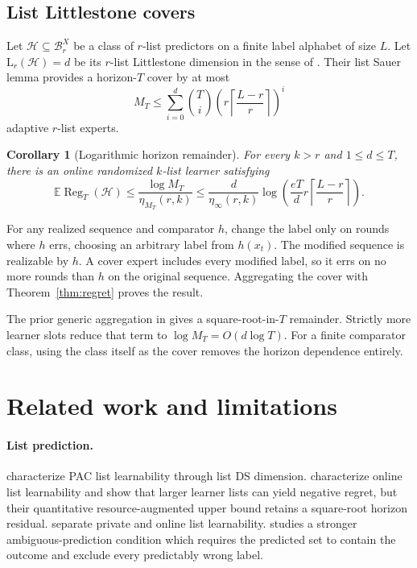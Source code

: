 \documentclass{article}
\newtheorem{corollary}[theorem]{Corollary}
\theoremstyle{definition}
\theoremstyle{remark}
\newcommand{\E}{\mathbb E}
\newcommand{\cH}{\mathcal H}
\newcommand{\cB}{\mathcal B}
\newcommand{\1}{\mathbf 1}
\newcommand{\Reg}{\operatorname{Reg}}
\begin{document}
\subsection{List Littlestone covers}

Let \(\cH\subseteq\cB_r^X\) be a class of \(r\)-list predictors on a finite label alphabet of size \(L\). Let \(\mathrm L_r(\cH)=d\) be its \(r\)-list Littlestone dimension in the sense of \citet{moran2023list}. Their list Sauer lemma provides a horizon-\(T\) cover by at most
\begin{equation}
\label{eq:cover-size}
M_T
\le\sum_{i=0}^d{T\choose i}
\left(r\left\lceil\frac{L-r}{r}\right\rceil\right)^i
\end{equation}
adaptive \(r\)-list experts.

\begin{corollary}[Logarithmic horizon remainder]
\label{cor:sequential}
For every \(k>r\) and \(1\le d\le T\), there is an online randomized \(k\)-list learner satisfying
\begin{equation}
\label{eq:sequential}
\E\Reg_T(\cH)
\le\frac{\log M_T}{\eta_{M_T}(r,k)}
\le
\frac d{\eta_\infty(r,k)}
\log\left(
\frac{eT}{d}
r\left\lceil\frac{L-r}{r}\right\rceil
\right).
\end{equation}
\end{corollary}

For any realized sequence and comparator \(h\), change the label only on rounds where \(h\) errs, choosing an arbitrary label from \(h(x_t)\). The modified sequence is realizable by \(h\). A cover expert includes every modified label, so it errs on no more rounds than \(h\) on the original sequence. Aggregating the cover with Theorem~\ref{thm:regret} proves the result.

The prior generic aggregation in \citet{moran2023list} gives a square-root-in-\(T\) remainder. Strictly more learner slots reduce that term to \(\log M_T=O(d\log T)\). For a finite comparator class, using the class itself as the cover removes the horizon dependence entirely.

\section{Related work and limitations}
\label{sec:related}

\paragraph{List prediction.}
\citet{charikar2023characterization} characterize PAC list learnability through list DS dimension. \citet{moran2023list} characterize online list learnability and show that larger learner lists can yield negative regret, but their quantitative resource-augmented upper bound retains a square-root horizon residual. \citet{hanneke2025private} separate private and online list learnability. \citet{kosoy2026ambiguous} studies a stronger ambiguous-prediction condition which requires the predicted set to contain the outcome and exclude every predictably wrong label.
\end{document}
